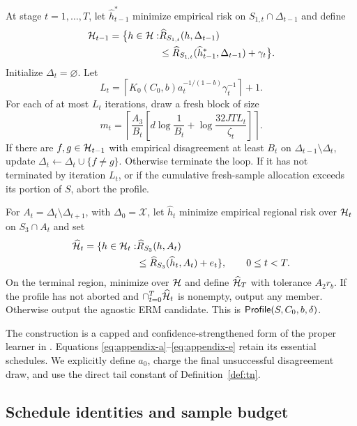 At stage $t=1,\ldots,T$, let $\widehat h^*_{t-1}$ minimize empirical risk on $S_{1,t}\cap\Delta_{t-1}$ and define
\begin{align}
 \mathcal H_{t-1}=\bigl\{h\in\mathcal H:
 &\widehat R_{S_{1,t}}(h,\Delta_{t-1})\nonumber\\
 &\leq\widehat R_{S_{1,t}}
 (\widehat h^*_{t-1},\Delta_{t-1})+\gamma_t\bigr\}.
 \label{eq:pruned-class}
\end{align}
Initialize $\Delta_t=\varnothing$. Let
\begin{equation}
 L_t=\left\lceil
 K_0(C_0,b)a_t^{-1/(1-b)}\gamma_t^{-1}
 \right\rceil+1.
 \label{eq:loop-cap}
\end{equation}
For each of at most $L_t$ iterations, draw a fresh block of size
\begin{equation}
 m_t=\left\lceil\frac{A_3}{B_t}
 \left[d\log\frac1{B_t}
 +\log\frac{32JT L_t}{\zeta_t}\right]\right\rceil.
 \label{eq:disagreement-size}
\end{equation}
If there are $f,g\in\mathcal H_{t-1}$ with empirical disagreement at least $B_t$ on $\Delta_{t-1}\setminus\Delta_t$, update $\Delta_t\leftarrow\Delta_t\cup\{f\ne g\}$. Otherwise terminate the loop. If it has not terminated by iteration $L_t$, or if the cumulative fresh-sample allocation exceeds its portion of $S$, abort the profile.

For $A_t=\Delta_t\setminus\Delta_{t+1}$, with $\Delta_0=\mathcal X$, let $\widehat h_t$ minimize empirical regional risk over $\mathcal H_t$ on $S_3\cap A_t$ and set
\begin{align}
 \widehat{\mathcal H}_t=\{h\in\mathcal H_t:
 &\widehat R_{S_3}(h,A_t)\nonumber\\
 &\leq\widehat R_{S_3}(\widehat h_t,A_t)+e_t\},
 \qquad 0\leq t<T.
 \label{eq:regional-set}
\end{align}
On the terminal region, minimize over $\mathcal H$ and define $\widehat{\mathcal H}_T$ with tolerance $A_2r_b$. If the profile has not aborted and $\cap_{t=0}^T\widehat{\mathcal H}_t$ is nonempty, output any member. Otherwise output the agnostic ERM candidate. This is $\mathsf{Profile}(S,C_0,b,\delta)$.

The construction is a capped and confidence-strengthened form of the proper learner in \citet{hanneke2026optimal}. Equations \eqref{eq:appendix-a}--\eqref{eq:appendix-e} retain its essential schedules. We explicitly define $a_0$, charge the final unsuccessful disagreement draw, and use the direct tail constant of Definition~\ref{def:tn}.

\subsection{Schedule identities and sample budget}


